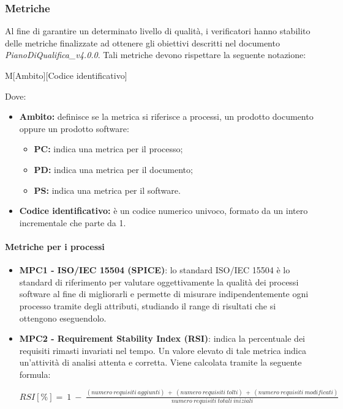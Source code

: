 \documentclass[11pt,a4paper]{article}
\begin{document}
{	
	\subsubsection{Metriche}
	Al fine di garantire un determinato livello di qualità, i verificatori hanno stabilito delle metriche finalizzate ad ottenere gli obiettivi descritti  nel documento \textit{PianoDiQualifica\_v4.0.0}. Tali metriche devono rispettare la seguente notazione: 
	\begin{center}
		M[Ambito][Codice identificativo]
	\end{center}
	Dove:
	\begin{itemize}
		\item \textbf{Ambito:} definisce se la metrica si riferisce a processi, un prodotto documento oppure un prodotto software:
		\begin{itemize}
			\item \textbf{PC:} indica una metrica per il processo;
			\item \textbf{PD:} indica una metrica per il documento;
			\item \textbf{PS:} indica una metrica per il software.
		\end{itemize}
		\item \textbf{Codice identificativo:} è un codice numerico univoco, formato da un intero incrementale che parte da 1.
	\end{itemize}
	
	\paragraph{Metriche per i processi}
	\begin{itemize}
	 \item \textbf{MPC1 - ISO/IEC 15504 (SPICE)}: lo standard ISO/IEC 15504 è lo standard di riferimento per valutare oggettivamente la qualità dei processi software al fine di migliorarli e permette di misurare indipendentemente ogni processo tramite degli attributi, studiando il range di risultati che si ottengono eseguendolo. 
	 
	 
	 \item \textbf{MPC2 - Requirement Stability Index (RSI)}: indica la percentuale dei requisiti rimasti invariati nel tempo. Un valore elevato di tale metrica indica un’attività di analisi attenta e corretta. Viene calcolata tramite la seguente formula:
	 \begin{center}
		$RSI[\%] =\ 1\ -\ \frac{(numero\ requisiti\ aggiunti)\ +\ (numero\ requisiti\ tolti)\ +\ (numero\ requisiti\ modificati)}{numero\ requisiti\ totali\ iniziali}$
	\end{center}
	

\end{itemize}}
\end{document}

